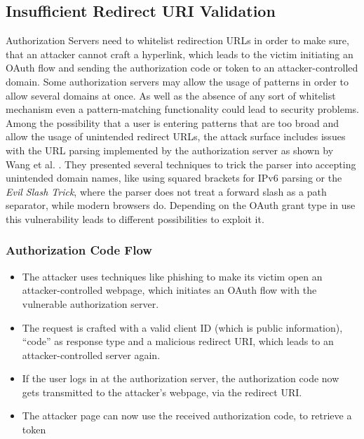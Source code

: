 \documentclass[
    fontsize=12pt,
    headings=small,
    parskip=half,           %
    bibliography=totoc,
    numbers=noenddot,       %
    open=any,               %
    ]{scrreprt}
\begin{document}
\subsection{Insufficient Redirect URI Validation \cite{lodderstedt2020oauth} \cite{wang2019make}}
Authorization Servers need to whitelist redirection URLs in order to make sure,
that an attacker cannot craft a hyperlink, which leads to the victim initiating
an OAuth flow and sending the authorization code or token to an
attacker-controlled domain. Some authorization servers may allow the usage of
patterns in order to allow several domains at once. As well as the absence of
any sort of whitelist mechanism even a pattern-matching functionality could
lead to security problems. Among the possibility that a user is entering
patterns that are too broad and allow the usage of unintended redirect URLs,
the attack surface includes issues with the URL parsing implemented by the
authorization server as shown by Wang et al. \cite{wang2019make}. They
presented several techniques to trick the parser into accepting unintended
domain names, like using squared brackets for IPv6 parsing or the \emph{Evil
Slash Trick}, where the parser does not treat a forward slash as a path
separator, while modern browsers do. Depending on the OAuth grant type in use
this vulnerability leads to different possibilities to exploit it.


\subsubsection{Authorization Code Flow}
\begin{itemize}

    \item The attacker uses techniques like phishing to make its victim open an
        attacker-controlled webpage, which initiates an OAuth flow with the
        vulnerable authorization server.
	
    \item The request is crafted with a valid client ID (which is public
        information), ``code'' as response type and a malicious redirect URI,
        which leads to an attacker-controlled server again.
	
    \item If the user logs in at the authorization server, the authorization
        code now gets transmitted to the attacker's webpage, via the redirect
        URI.
	
    \item The attacker page can now use the received authorization code, to
        retrieve a token 

\end{itemize}
\end{document}
